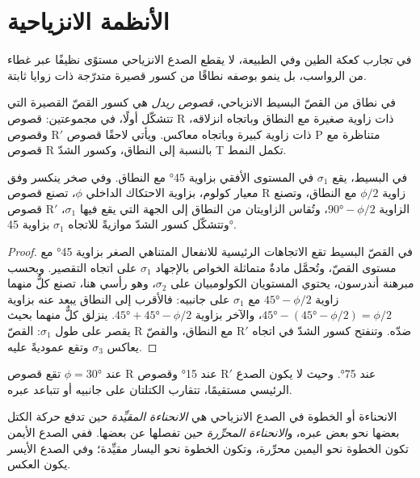 \section{الأنظمة الانزياحية}\label{sec:b3:extension-strike-slip:strike-slip}

في تجارب كعكة الطين وفي الطبيعة، لا يقطع الصدع الانزياحي مستوًى نظيفًا عبر غطاء من الرواسب،
بل ينمو بوصفه نطاقًا من كسور قصيرة متدرّجة
ذات زوايا ثابتة.

\begin{definition}[قصّ ريدل]\label{def:b3:extension-strike-slip:riedel}
في نطاق من القصّ البسيط الانزياحي، \emph{قصوص ريدل}
هي كسور القصّ القصيرة التي تتشكّل أولًا، في مجموعتين: قصوص R
ذات زاوية صغيرة مع النطاق وباتجاه انزلاقه، وقصوص R$'$
ذات زاوية كبيرة وباتجاه معاكس. ويأتي لاحقًا قصوص P متناظرة
مع قصوص R بالنسبة إلى النطاق، وكسور الشدّ T تكمل النمط.
\end{definition}

\begin{proposition}\label{prop:b3:extension-strike-slip:riedel}
في  البسيط، يقع $\sigma_1$ في المستوى الأفقي بزاوية
\ang{45} مع النطاق. وفي صخر ينكسر وفق معيار كولوم، بزاوية الاحتكاك الداخلي
$\phi$، تصنع قصوص R زاوية $\phi/2$ مع
النطاق، وتصنع قصوص R$'$ الزاوية $\ang{90} - \phi/2$، وتُقاس الزاويتان من النطاق
إلى الجهة التي يقع فيها $\sigma_1$، وتتشكّل كسور الشدّ موازيةً للاتجاه $\sigma_1$
بزاوية \ang{45}.
\end{proposition}

\begin{proof}
في القصّ البسيط تقع الاتجاهات الرئيسية للانفعال المتناهي الصغر بزاوية
\ang{45} مع مستوى القصّ، وتُحمَّل مادةٌ متماثلة الخواص
بالإجهاد $\sigma_1$ على اتجاه التقصير. وبحسب مبرهنة أندرسون، يحتوي المستويان الكولومبيان على $\sigma_2$، وهو رأسي هنا،
تصنع كلٌّ منهما زاوية $\ang{45} - \phi/2$ مع $\sigma_1$ على جانبيه:
فالأقرب إلى النطاق يبعد عنه بزاوية $\ang{45} -
(\ang{45} - \phi/2) = \phi/2$، والآخر بزاوية $\ang{45} + \ang{45} -
\phi/2$. ينزلق كلٌّ منهما بحيث يقصر على طول $\sigma_1$: القصّ R مع النطاق، والقصّ R$'$ ضدّه.
وتنفتح كسور الشدّ في اتجاه يعاكس $\sigma_3$
وتقع عموديةً عليه.
\end{proof}

عند $\phi = \ang{30}$ تقع قصوص R عند \ang{15} وقصوص R$'$ عند
\ang{75}. وحيث لا يكون الصدع الرئيسي مستقيمًا، تتقارب الكتلتان على جانبيه
أو تتباعد عبره.

\begin{definition}\label{def:b3:extension-strike-slip:bends}
الانحناءة أو الخطوة في الصدع الانزياحي هي \emph{الانحناءة
المقيِّدة} حين تدفع حركة الكتل بعضها نحو بعض عبره،
و\emph{الانحناءة المحرِّرة} حين
تفصلها عن بعضها. ففي الصدع الأيمن تكون الخطوة نحو اليمين محرِّرة، وتكون الخطوة نحو اليسار
مقيِّدة؛ وفي الصدع الأيسر يكون العكس.
\end{definition}

